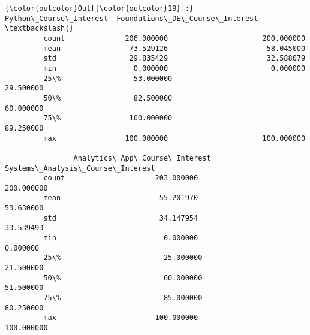\documentclass[11pt]{article}
\begin{document}
\begin{Verbatim}[commandchars=\\\{\}]
{\color{outcolor}Out[{\color{outcolor}19}]:}        Python\_Course\_Interest  Foundations\_DE\_Course\_Interest  \textbackslash{}
         count              206.000000                      200.000000   
         mean                73.529126                       58.045000   
         std                 29.835429                       32.588079   
         min                  0.000000                        0.000000   
         25\%                 53.000000                       29.500000   
         50\%                 82.500000                       60.000000   
         75\%                100.000000                       89.250000   
         max                100.000000                      100.000000   
         
                Analytics\_App\_Course\_Interest  Systems\_Analysis\_Course\_Interest  
         count                     203.000000                        200.000000  
         mean                       55.201970                         53.630000  
         std                        34.147954                         33.539493  
         min                         0.000000                          0.000000  
         25\%                        25.000000                         21.500000  
         50\%                        60.000000                         51.500000  
         75\%                        85.000000                         80.250000  
         max                       100.000000                        100.000000  
\end{Verbatim}
            
\end{document}
